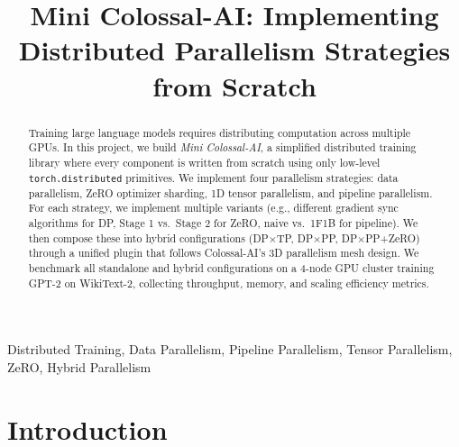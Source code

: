 \documentclass[conference]{IEEEtran}
\begin{document}
\title{Mini Colossal-AI: Implementing Distributed Parallelism Strategies from Scratch\\}

\author{
\and
{}
\and
{}
\and
{}
}

\maketitle

\begin{abstract}
Training large language models requires distributing computation across multiple GPUs. In this project, we build \textit{Mini Colossal-AI}, a simplified distributed training library where every component is written from scratch using only low-level \texttt{torch.distributed} primitives. We implement four parallelism strategies: data parallelism, ZeRO optimizer sharding, 1D tensor parallelism, and pipeline parallelism. For each strategy, we implement multiple variants (e.g., different gradient sync algorithms for DP, Stage 1 vs.\ Stage 2 for ZeRO, naive vs.\ 1F1B for pipeline). We then compose these into hybrid configurations (DP$\times$TP, DP$\times$PP, DP$\times$PP+ZeRO) through a unified plugin that follows Colossal-AI's 3D parallelism mesh design. We benchmark all standalone and hybrid configurations on a 4-node GPU cluster training GPT-2 on WikiText-2, collecting throughput, memory, and scaling efficiency metrics.
\end{abstract}

\begin{IEEEkeywords}
Distributed Training, Data Parallelism, Pipeline Parallelism, Tensor Parallelism, ZeRO, Hybrid Parallelism
\end{IEEEkeywords}

\section{Introduction}
\end{document}
